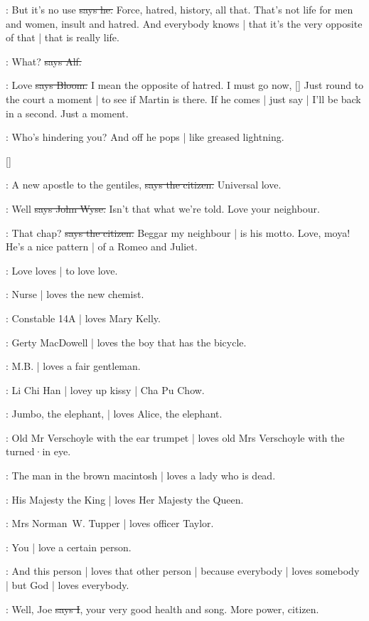 \Bloom:
But it's no use
\sout{says he.}
Force,
hatred,
history,
all that.
That's not life for men and women,
insult and hatred.
And everybody knows |
that it's the very opposite of that |
that is really life.

\bergan:
What?
\sout{says Alf.}

\Bloom:
Love
\sout{says Bloom.}
I mean the opposite of hatred.
I must go now,
[]
Just round to the court a moment |
to see if Martin is there.
If he comes |
just say |
I'll be back in a second.
Just a moment.

\Nq:
Who's hindering you?
And off he pops |
like greased lightning.

[]

\citizen:
A new apostle to the gentiles,
\sout{says the citizen.}
Universal love.

\johnwyse:
Well
\sout{says John Wyse.}
Isn't that what we're told.
Love your neighbour.

\citizen:
That chap?
\sout{says the citizen.}
Beggar my neighbour |
is his motto.
Love,
moya!
He's a nice pattern |
of a Romeo and Juliet.

:
Love loves |
to love love.

:
Nurse |
loves the new chemist.

:
Constable 14A |
loves Mary Kelly.

:
Gerty MacDowell |
loves the boy that has the bicycle.

:
M.B. |
loves a fair gentleman.

:
Li Chi Han |
lovey up kissy |
Cha Pu Chow.

:
Jumbo, the elephant, |
loves Alice, the elephant.

:
Old Mr Verschoyle with the ear trumpet |
loves old Mrs Verschoyle with the turned·in eye.

:
The man in the brown macintosh |
loves a lady who is dead.

:
His Majesty the King |
loves Her Majesty the Queen.

:
Mrs Norman~W. Tupper |
loves officer Taylor.

:
You |
love a certain person.

:
And this person |
loves that other person |
because everybody |
loves somebody |
but God |
loves everybody.

:
Well,
Joe
\sout{says I},
your very good health and song.
More power,
citizen.

